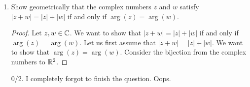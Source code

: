 \begin{enumerate}
\begin{enumerate}
		\item $\Arg\left((1-\sqrt{3}i)^{10}\right)$
		
			\begin{problem}
				From earlier, I know that $\tan^{-1}\cpr{\frac{-\sqrt{3}}1}=\frac{-\pi}3$. Via the rules of complex powers, I know that the angle is $10\cdot \frac{-\pi}3$, which simplifies to $\frac{-4\pi}3$, which in $\Arg{z}$ is $\frac{2}3\pi$. 
			\end{problem}
		
		\begin{grade}
			2/2. Got each question correct. 
		\end{grade}
	\end{enumerate}
	
	\item Show geometrically that the complex numbers $z$ and $w$ satisfy $|z+w| = |z|+|w|$ if and only if $\arg(z) = \arg(w)$.
	
		\begin{proof}
			Let $z, w\in\mathbb{C}$. We want to show that $|z+w| = |z|+|w|$ if and only if $\arg(z) = \arg(w)$.\gline{}
			Let us first assume that $|z+w| = |z| +|w|$. We want to show that $\arg(z) = \arg(w)$. Consider the bijection from the complex numbers to $\mathbb{R}^2$. 
		\end{proof}
		\begin{grade}
			0/2. I completely forgot to finish the question. Oops. 
		\end{grade}
\end{enumerate}




